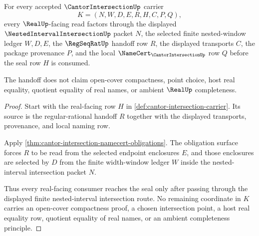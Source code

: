\begin{theorem}
\label{thm:cantor-intersection-real-seal-handoff}
For every accepted $\CantorIntersectionUp$ carrier
$$
K=(N,W,D,E,R,H,C,P,Q),
$$
every $\RealUp$-facing read factors through the displayed $\NestedIntervalIntersectionUp$ packet $N$, the selected finite nested-window ledger $W,D,E$, the $\RegSeqRatUp$ handoff row $R$, the displayed transports $C$, the package provenance $P$, and the local $\NameCert_{\CantorIntersectionUp}$ row $Q$ before the seal row $H$ is consumed.

The handoff does not claim open-cover compactness, point choice, host real equality, quotient equality of real names, or ambient $\RealUp$ completeness.
\end{theorem}
\begin{proof}
Start with the real-facing row $H$ in \autoref{def:cantor-intersection-carrier}. Its source is the regular-rational handoff $R$ together with the displayed transports, provenance, and local naming row.

Apply \autoref{thm:cantor-intersection-namecert-obligations}. The obligation surface forces $R$ to be read from the selected endpoint enclosures $E$, and those enclosures are selected by $D$ from the finite width-window ledger $W$ inside the nested-interval intersection packet $N$.

Thus every real-facing consumer reaches the seal only after passing through the displayed finite nested-interval intersection route. No remaining coordinate in $K$ carries an open-cover compactness proof, a chosen intersection point, a host real equality row, quotient equality of real names, or an ambient completeness principle.
\end{proof}

